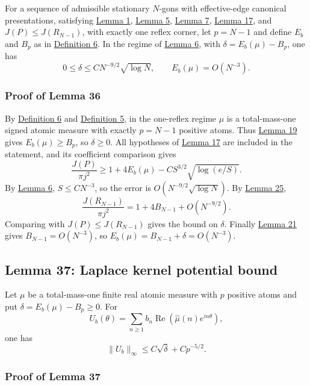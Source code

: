 \documentclass[11pt]{article}
\begin{document}
For a sequence of admissible stationary \(N\)-gons with effective-edge
canonical presentations, satisfying \hyperref[lem-edge-moments]{Lemma
1}, \hyperref[lem-disk-perturbation]{Lemma 5},
\hyperref[lem-gradient-perturbation]{Lemma 7},
\hyperref[lem-spectral-core]{Lemma 17}, and \(J(P)\le J(R_{N-1})\), with
exactly one reflex corner, let \(p=N-1\) and define \(E_b\) and \(B_p\)
as in \hyperref[def-positive-kernel]{Definition 6}. In the regime of
\hyperref[lem-near-circle-conformal]{Lemma 6}, with
\(\delta=E_b(\mu)-B_p\), one has \[
0\le\delta\le C N^{-9/2}\sqrt{\log N},
\qquad E_b(\mu)=O(N^{-3}).
\]

\subsubsection{Proof of Lemma 36}\label{proof-lem-one-reflex-energy-gap}

By \hyperref[def-positive-kernel]{Definition 6} and
\hyperref[def-turn-measure]{Definition 5}, in the one-reflex regime
\(\mu\) is a total-mass-one signed atomic measure with exactly \(p=N-1\)
positive atoms. Thus \hyperref[lem-kernel-comparison]{Lemma 19} gives
\(E_b(\mu)\ge B_p\), so \(\delta\ge0\). All hypotheses of
\hyperref[lem-spectral-core]{Lemma 17} are included in the statement,
and its coefficient comparison gives \[
\frac{J(P)}{\pi j^2}\ge1+4E_b(\mu)-C S^{3/2}\sqrt{\log(e/S)}.
\] By \hyperref[lem-near-circle-conformal]{Lemma 6}, \(S\le CN^{-3}\),
so the error is \(O(N^{-9/2}\sqrt{\log N})\). By
\hyperref[lem-regular-polygon-asymptotic]{Lemma 25}, \[
\frac{J(R_{N-1})}{\pi j^2}=1+4B_{N-1}+O(N^{-9/2}).
\] Comparing with \(J(P)\le J(R_{N-1})\) gives the bound on \(\delta\).
Finally \hyperref[lem-bp-asymptotic]{Lemma 21} gives
\(B_{N-1}=O(N^{-3})\), so \(E_b(\mu)=B_{N-1}+\delta=O(N^{-3})\).

\subsection{Lemma 37: Laplace kernel potential
bound}\label{lem-kernel-potential-bound}

Let \(\mu\) be a total-mass-one finite real atomic measure with \(p\)
positive atoms and put \(\delta=E_b(\mu)-B_p\ge0\). For \[
U_b(\theta)=\sum_{n\ge1}b_n\operatorname{Re}(\widehat\mu(n)e^{in\theta}),
\] one has \[
\|U_b\|_\infty\le C\sqrt\delta+C p^{-5/2}.
\]

\subsubsection{Proof of Lemma
37}\label{proof-lem-kernel-potential-bound}
\end{document}
